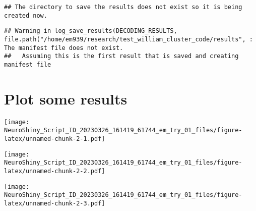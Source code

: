 \documentclass[
]{article}
\newenvironment{Shaded}{\begin{snugshade}}{\end{snugshade}}
\newcommand{\AttributeTok}[1]{\textcolor[rgb]{0.77,0.63,0.00}{#1}}
\newcommand{\FunctionTok}[1]{\textcolor[rgb]{0.00,0.00,0.00}{#1}}
\newcommand{\NormalTok}[1]{#1}
\newcommand{\SpecialCharTok}[1]{\textcolor[rgb]{0.00,0.00,0.00}{#1}}
\newcommand{\StringTok}[1]{\textcolor[rgb]{0.31,0.60,0.02}{#1}}
\begin{document}
\begin{verbatim}
## The directory to save the results does not exist so it is being created now.
\end{verbatim}

\begin{verbatim}
## Warning in log_save_results(DECODING_RESULTS, file.path("/home/em939/research/test_william_cluster_code/results", : The manifest file does not exist.
##   Assuming this is the first result that is saved and creating manifest file
\end{verbatim}

\hypertarget{plot-some-results}{%
\section{Plot some results}\label{plot-some-results}}

\begin{Shaded}
\end{Shaded}

\texttt{[image: NeuroShiny\_Script\_ID\_20230326\_161419\_61744\_em\_try\_01\_files/figure-latex/unnamed-chunk-2-1.pdf]}

\begin{Shaded}
\end{Shaded}

\texttt{[image: NeuroShiny\_Script\_ID\_20230326\_161419\_61744\_em\_try\_01\_files/figure-latex/unnamed-chunk-2-2.pdf]}

\begin{Shaded}
\end{Shaded}

\texttt{[image: NeuroShiny\_Script\_ID\_20230326\_161419\_61744\_em\_try\_01\_files/figure-latex/unnamed-chunk-2-3.pdf]}
\end{document}
